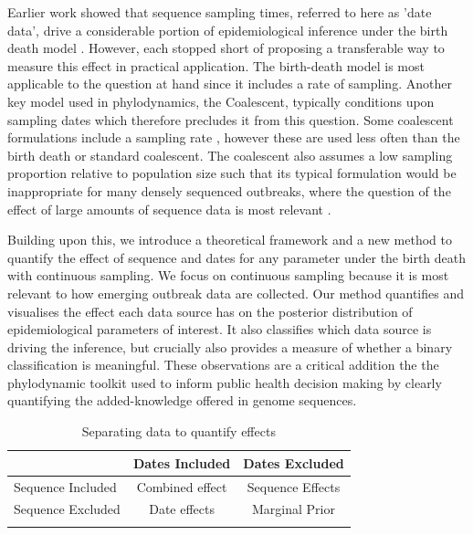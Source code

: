 \documentclass{article}
\begin{document}
Earlier work showed that sequence sampling times, referred to here as 'date data', drive a considerable portion of epidemiological inference under the birth death model \citep{volz_sampling_2014, boskova2018influence, Featherstone2021Infectious}. However, each stopped short of proposing a transferable way to measure this effect in practical application. The birth-death model is most applicable to the question at hand since it includes a rate of sampling. Another key model used in phylodynamics, the Coalescent, typically conditions upon sampling dates which therefore precludes it from this question. Some coalescent formulations include a sampling rate \citep{volz_sampling_2014}, however these are used less often than the birth death or standard coalescent. The coalescent also assumes a low sampling proportion relative to population size such that its typical formulation would be inappropriate for many densely sequenced outbreaks, where the question of the effect of large amounts of sequence data is most relevant \citep{boskova2018influence}.

Building upon this, we introduce a theoretical framework and a new method to quantify the effect of sequence and dates for any parameter under the birth death with continuous sampling. We focus on continuous sampling because it is most relevant to how emerging outbreak data are collected. Our method quantifies and visualises the effect each data source has on the posterior distribution of epidemiological parameters of interest. It also classifies which data source is driving the inference, but crucially also provides a measure of  whether  a binary classification is meaningful. These observations are a critical addition the the phylodynamic toolkit used to inform public health decision making by clearly quantifying the added-knowledge offered in genome sequences.

\begin{table}[H]
\centering
\caption{Separating data to quantify effects}
\begin{tabular}{lcc}
                                    &   Dates Included                  &   Dates Excluded    \\
\midrule
Sequence Included                   &   Combined effect                 &   Sequence Effects            \\
Sequence Excluded                   &   Date effects                    &   Marginal Prior     \\
\bottomrule 
\label{tab:tab1}
\end{tabular}
\end{table}
\end{document}
